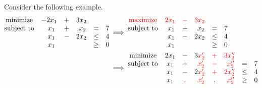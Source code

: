 \begin{example}
    Consider the following example.
    \begin{align*}
        \begin{matrix}
            \text{minimize}   & -2x_1 & + & 3x_2            \\
            \text{subject to} & ~~x_1 & + & ~x_2 & =    & 7 \\
                              & ~~x_1 & - & 2x_2 & \leq & 4 \\
                              & ~~x_1 &   &      & \geq & 0
        \end{matrix} & \implies
        \begin{matrix}
            \color{red}\text{maximize} & \color{red} 2x_1 & \color{red}- & \color{red} 3x_2            \\
            \text{subject to}          &             ~x_1 & +            &             ~x_2 & =    & 7 \\
                                       &             ~x_1 & -            &             2x_2 & \leq & 4 \\
                                       &             ~x_1 &              &                  & \geq & 0
        \end{matrix} \\ & \implies
        \begin{matrix}
            \text{minimize}   & 2x_1 & -            & 3\color{red}x_2' & \color{red}+ & \color{red}3x_2''            \\
            \text{subject to} & x_1  & +            & \color{red}~x_2' & \color{red}- & \color{red}~x_2'' & =    & 7 \\
                              & x_1  & -            & 2\color{red}x_2' & \color{red}+ & \color{red}2x_2'' & \leq & 4 \\
                              & x_1  & \color{red}, & \color{red}~x_2' & \color{red}, & \color{red}~x_2'' & \geq & 0
        \end{matrix}
    \end{align*}
\end{example}